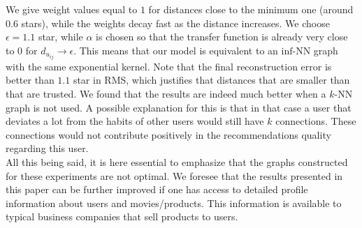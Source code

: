 \documentclass{article}
\begin{document}
We give weight values equal to $1$ for distances close to the minimum one (around $0.6$ stars), while the weights decay fast as the distance increases. We choose $\epsilon = 1.1$ star, while $\alpha$ is chosen so that the transfer function is already very close to $0$ for $d_{u_{ij}}\rightarrow \epsilon$. This means that our model is equivalent to an $\text{inf}$-NN graph with the same exponential kernel. Note that the final reconstruction error is better than $1.1$ star in RMS, which justifies that distances that are smaller than that are trusted. We found that the results are indeed much better when a $k$-NN graph is not used. A possible explanation for this is that in that case a user that deviates a lot from the habits of other users would still have $k$ connections. These connections would not contribute positively in the recommendations quality regarding this user. \\ 
All this being said, it is here essential to emphasize that the graphs constructed for these experiments are not optimal. We foresee that the results presented in this paper can be further improved if one has access to detailed profile information about users and movies/products. This information is available to typical business companies that sell products to users.
\end{document}
